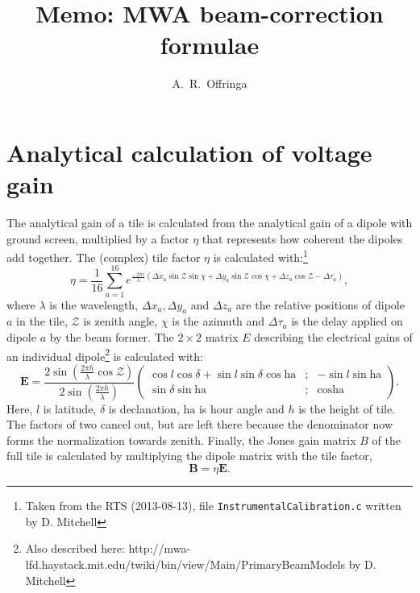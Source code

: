 \documentclass[a4paper,11pt]{article}
\title{Memo: MWA beam-correction formulae}
\author{A.~R.~Offringa}
\begin{document}
\label{firstpage}
\maketitle

\section{Analytical calculation of voltage gain}
The analytical gain of a tile is calculated from the analytical gain of a dipole with ground screen, multiplied by a factor $\eta$ that represents how coherent the dipoles add together. The (complex) tile factor $\eta$ is calculated with:\footnote{Taken from the RTS (2013-08-13), file \texttt{InstrumentalCalibration.c} written by D. Mitchell}
\begin{equation}
 \eta = \frac{1}{16}\sum\limits_{a=1}^{16} e^{\frac{-2 \pi i}{\lambda} \left(\Delta x_a \sin \mathcal{Z} \sin \chi + \Delta y_a \sin \mathcal{Z} \cos \chi + \Delta z_a \cos \mathcal{Z} - \Delta \tau_a \right) },
\end{equation}
where $\lambda$ is the wavelength, $\Delta x_a, \Delta y_a$ and $\Delta z_a$ are the relative positions of dipole $a$ in the tile, $\mathcal{Z}$ is zenith angle, $\chi$ is the azimuth and $\Delta \tau_a$ is the delay applied on dipole $a$ by the beam former. The $2 \times 2$ matrix $E$ describing the electrical gains of an individual dipole\footnote{Also described here: http://mwa-lfd.haystack.mit.edu/twiki/bin/view/Main/PrimaryBeamModels by D. Mitchell} is calculated with:
\begin{equation}
\mathbf{E} = \frac{2 \sin \left( \frac{2 \pi h}{\lambda} \cos \mathcal{Z}\right)}{2 \sin \left( \frac{2 \pi h}{\lambda}\right)}
\left( \begin{array}{ccc}
\cos l \cos \delta + \sin l \sin \delta \cos \textrm{ha} & ; & -\sin l \sin \textrm{ha} \\
\sin \delta \sin \textrm{ha} & ; & \cos \textrm{ha}
\end{array} \right).
\end{equation}
Here, $l$ is latitude, $\delta$ is declanation, $\textrm{ha}$ is hour angle and $h$ is the height of tile. The factors of two cancel out, but are left there because the denominator now forms the normalization towards zenith. Finally, the Jones gain matrix $B$ of the full tile is calculated by multiplying the dipole matrix with the tile factor,
\begin{equation}
\mathbf{B} = \eta \mathbf{E}.
\end{equation}
\end{document}

